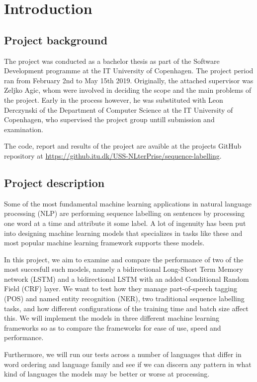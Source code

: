 
\section{Introduction}

\subsection{Project background}

The project was conducted as a bachelor thesis as part of the Software
Development programme at the IT University of Copenhagen. The project period ran
from February 2nd to May 15th 2019. Originally, the attached supervisor was
Zeljko Agic, whom were involved in deciding the scope and the main problems of
the project. Early in the process however, he was substituted with Leon
Derczynski of the Department of Computer Science at the IT University of
Copenhagen, who supervised the project group untill submission and examination.

The code, report and results of the project are avaible at the projects GitHub
repository at \url{https://github.itu.dk/USS-NLterPrise/sequence-labelling}.


\subsection{Project description}

Some of the most fundamental machine learning applications in natural language
processing (NLP) are performing sequence labelling on sentences by processing
one word at a time and attribute it some label. A lot of ingenuity has been put
into designing machine learning models that specializes in tasks like these and
most popular machine learning framework supports these models.

In this project, we aim to examine and compare the performance of two of the
most succesfull such models, namely a bidirectional Long-Short Term Memory
network (LSTM) and a bidirectional LSTM with an added Conditional Random Field
(CRF) layer. We want to test how they manage part-of-speech tagging (POS) and
named entity recognition (NER), two traditional sequence labelling tasks, and how
different configurations of the training time and batch size affect this.
We will implement the models in three different machine learning frameworks so
as to compare the frameworks for ease of use, speed and performance.

Furthermore, we will run our tests across a number of languages that differ in
word ordering and language family and see if we can discern any pattern in what
kind of languages the models may be better or worse at processing.


